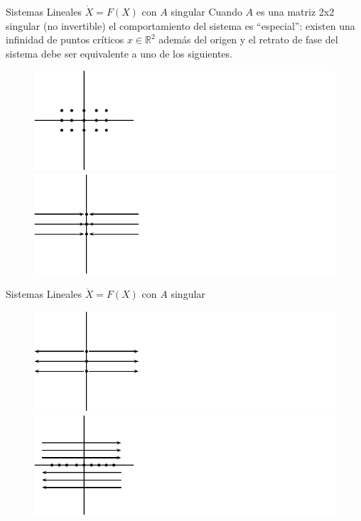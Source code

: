 \documentclass{beamer}
\newcommand{\R}{{\ensuremath{\mathbb{R}}}}
\begin{document}
\begin{frame}{Sistemas Lineales $\dot{X} = F(X)$ con $A$ singular}
Cuando $A$ es una matriz 2x2 singular (no invertible) el comportamiento del sistema es ``especial'': existen una infinidad de puntos críticos $x \in \R^2$ además del origen y el retrato de fase del sistema debe ser equivalente a uno de los siguientes.

\begin{figure} \centering
    \includegraphics[scale=1.0]{../figures/amatriz0.pdf}  
    \includegraphics[scale=1.0]{../figures/asingular_1.pdf}
\end{figure}

\end{frame}

\begin{frame}{Sistemas Lineales $\dot{X} = F(X)$ con $A$ singular}
\begin{figure} \centering
    \includegraphics[scale=1.0]{../figures/asingular1.pdf}
    \includegraphics[scale=1.0]{../figures/asingularr1.pdf}
\end{figure}
\end{frame}
\end{document}
